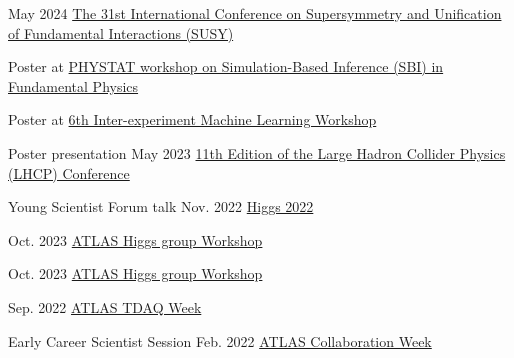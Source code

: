 
\begin{cventries}
    {}
    {May 2024}
    {\href{https://indico.cern.ch/event/1354279/contributions/5942297/}{The 31st International Conference on Supersymmetry and Unification of Fundamental Interactions (SUSY)}}
    {}\vspace*{2mm}

    {}
    {}
    {}
    {
        \begin{cvitems}
        \item Poster at \href{https://indico.cern.ch/event/1355601/contributions/5910202/}{PHYSTAT workshop on Simulation-Based Inference (SBI) in Fundamental Physics}
        \item Poster at \href{https://indico.cern.ch/event/1297159/contributions/5729232/}{6th Inter-experiment Machine Learning Workshop}
        \end{cvitems}
    }\vspace*{2mm}
    
    {Poster presentation}
    {May 2023}
    {\href{https://indico.cern.ch/event/1198609/contributions/5340462/}{11th Edition of the Large Hadron Collider Physics (LHCP) Conference}}
    {}\vspace*{2mm}
    
    {Young Scientist Forum talk}
    {Nov. 2022}
    {\href{https://indico.cern.ch/event/1086716/contributions/5049260/}{Higgs 2022}}
    {}\vspace*{2mm}


    {}
    {Oct. 2023}
    {\href{https://indico.cern.ch/event/1280531/contributions/5556190/}{ATLAS Higgs group Workshop}}{}\vspace*{2mm}

    {}
    {Oct. 2023}
    {\href{https://indico.cern.ch/event/1280531/contributions/5559532/}{ATLAS Higgs group Workshop}}{}\vspace*{2mm}

    {}
    {Sep. 2022}
    {\href{https://indico.cern.ch/event/1172448/contributions/4924082/}{ATLAS TDAQ Week}}
    {}\vspace*{2mm}

    {Early Career Scientist Session}
    {Feb. 2022}
    {\href{https://indico.cern.ch/event/1108354/\#167-readiness-of-the-jet-trigg}{ATLAS Collaboration Week}}{}

\end{cventries}
